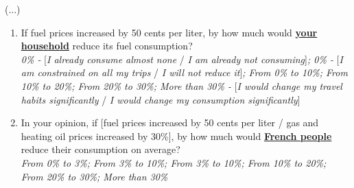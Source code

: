 \documentclass[english,5p,authoryear]{elsarticle}
\begin{document}
\begin{appendices}
(...)\emph{}
\begin{enumerate}[resume,leftmargin=*]
\item If fuel prices increased by 50 cents per liter, by how much would
\textbf{\uline{your household}} reduce its fuel consumption? \emph{}\\
\emph{0\% -} {[}\emph{I already consume almost none }/\emph{ I am
already not consuming}{]}\emph{; 0\% - }{[}\emph{I am constrained
on all my trips} / \emph{I will not reduce it}{]}\emph{; From 0\%
to 10\%; From 10\% to 20\%; From 20\% to 30\%; More than 30\% - }{[}\emph{I
would change my travel habits significantly }/ \emph{I would change
my consumption significantly}{]}
\item In your opinion, if {[}fuel prices increased by 50 cents per liter
/ gas and heating oil prices increased by 30\%{]}, by how much would
\textbf{\uline{French people}} reduce their consumption on average?
\emph{}\\
\emph{From 0\% to 3\%; From 3\% to 10\%; From 3\% to 10\%; From 10\%
to 20\%; From 20\% to 30\%; More than 30\%} 
\end{enumerate}


\end{appendices}
\end{document}
